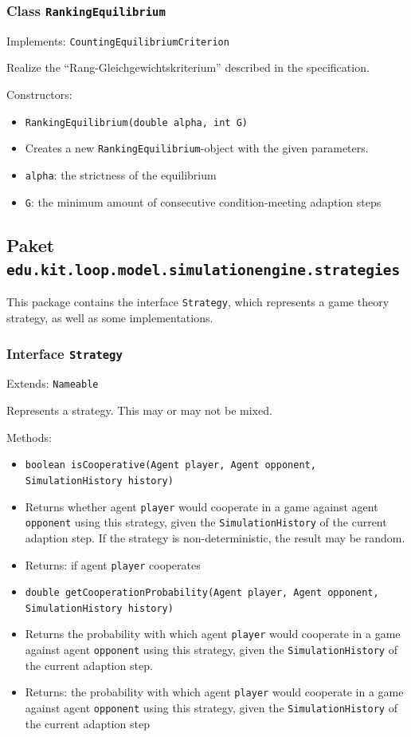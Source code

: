 \documentclass[parskip=full,11pt]{scrartcl}
\begin{document}
\subsubsection{Class \texttt{RankingEquilibrium}}
Implements: \texttt{CountingEquilibriumCriterion}

Realize the \enquote{Rang-Gleichgewichtskriterium} described in the specification.

Constructors:
\begin{itemize}\itemsep -10pt
\item \texttt{RankingEquilibrium(double alpha, int G)}
\item[] Creates a new \texttt{RankingEquilibrium}-object with the given parameters.
\item[] \texttt{alpha}: the strictness of the equilibrium
\item[] \texttt{G}: the minimum amount of consecutive condition-meeting adaption steps
\end{itemize}

\subsection{Paket \texttt{edu.kit.loop.model.simulationengine.strategies}}
This package contains the interface \texttt{Strategy}, which represents a game theory strategy, as well as some implementations.


\subsubsection{Interface \texttt{Strategy}}
Extends: \texttt{Nameable}

Represents a strategy. This may or may not be mixed.

Methods:
\begin{itemize}\itemsep -10pt
\item \texttt{boolean isCooperative(Agent player, Agent opponent, SimulationHistory history)}
\item[] Returns whether agent \texttt{player} would cooperate in a game against agent \texttt{opponent} using this strategy, given the \texttt{SimulationHistory} of the current adaption step. If the strategy is non-deterministic, the result may be random.
\item[] Returns: if agent \texttt{player} cooperates

\item \texttt{double getCooperationProbability(Agent player, Agent opponent, SimulationHistory history)}
\item[] Returns the probability with which agent \texttt{player} would cooperate in a game against agent \texttt{opponent} using this strategy, given the \texttt{SimulationHistory} of the current adaption step.
\item[] Returns: the probability with which agent \texttt{player} would cooperate in a game against agent \texttt{opponent} using this strategy, given the \texttt{SimulationHistory} of the current adaption step
\end{itemize}
\end{document}
